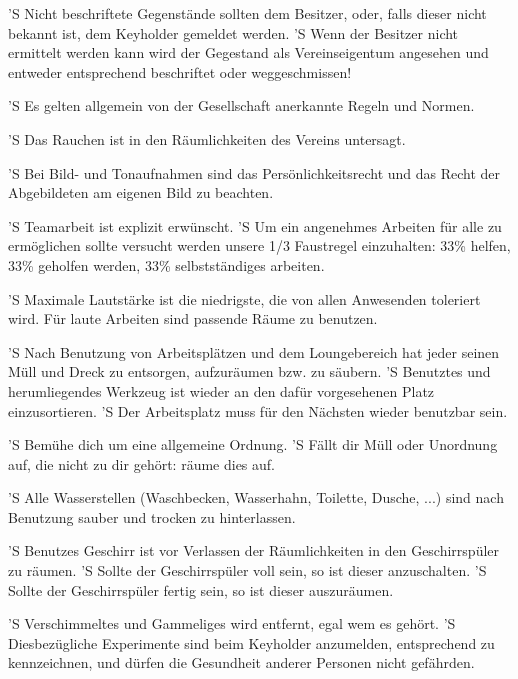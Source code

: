 \documentclass[a4paper,10pt]{scrreprt}
\begin{document}
\begin{contract}
'S Nicht beschriftete Gegenstände sollten dem Besitzer, oder, falls dieser
nicht bekannt ist, dem Keyholder gemeldet werden.
'S Wenn der Besitzer nicht ermittelt werden kann wird der Gegestand als
Vereinseigentum angesehen und entweder entsprechend beschriftet oder
weggeschmissen!


'S Es gelten allgemein von der Gesellschaft anerkannte Regeln und Normen.

'S Das Rauchen ist in den Räumlichkeiten des Vereins untersagt.

'S Bei Bild- und Tonaufnahmen sind das Persönlichkeitsrecht und das Recht der
Abgebildeten am eigenen Bild zu beachten.

'S Teamarbeit ist explizit erwünscht.
'S Um ein angenehmes Arbeiten für alle zu ermöglichen sollte versucht werden
unsere 1/3 Faustregel einzuhalten: 33\% helfen, 33\% geholfen werden, 33\%
selbstständiges arbeiten.

'S Maximale Lautstärke ist die niedrigste, die von allen Anwesenden toleriert
wird. Für laute Arbeiten sind passende Räume zu benutzen.


'S Nach Benutzung von Arbeitsplätzen und dem Loungebereich hat jeder seinen
Müll und Dreck zu entsorgen, aufzuräumen bzw. zu säubern.
'S Benutztes und herumliegendes Werkzeug ist wieder an den dafür vorgesehenen
Platz einzusortieren.
'S Der Arbeitsplatz muss für den Nächsten wieder benutzbar sein.

'S Bemühe dich um eine allgemeine Ordnung.
'S Fällt dir Müll oder Unordnung auf, die nicht zu dir gehört: räume dies auf.

'S Alle Wasserstellen (Waschbecken, Wasserhahn, Toilette, Dusche, ...) sind
nach Benutzung sauber und trocken zu hinterlassen.

'S Benutzes Geschirr ist vor Verlassen der Räumlichkeiten in den
Geschirrspüler zu räumen.
'S Sollte der Geschirrspüler voll sein, so ist dieser anzuschalten.
'S Sollte der Geschirrspüler fertig sein, so ist dieser auszuräumen.

'S Verschimmeltes und Gammeliges wird entfernt, egal wem es gehört.
'S Diesbezügliche Experimente sind beim Keyholder anzumelden, entsprechend zu
kennzeichnen, und dürfen die Gesundheit anderer Personen nicht gefährden.

\end{contract}
\end{document}
